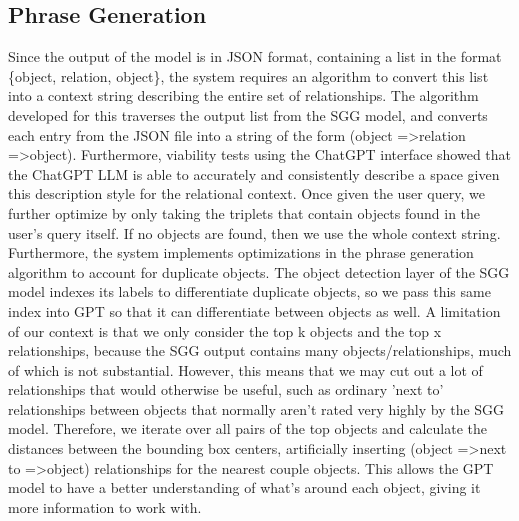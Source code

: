 \documentclass[letterpaper, 10 pt, conference]{ieeeconf}  %
\begin{document}
    
    \subsection*{Phrase Generation}
        Since the output of the model is in JSON format, containing a list in the format \{object, relation, object\}, the system requires an algorithm to convert this list into a context string describing the entire set of relationships. The algorithm developed for this traverses the output list from the SGG model, and converts each entry from the JSON file into a string of the form (object =\textgreater  relation =\textgreater  object). Furthermore, viability tests using the ChatGPT interface showed that the ChatGPT LLM is able to accurately and consistently describe a space given this description style for the relational context. Once given the user query, we further optimize by only taking the triplets that contain objects found in the user's query itself. If no objects are found, then we use the whole context string. Furthermore, the system implements optimizations in the phrase generation algorithm to account for duplicate objects. The object detection layer of the SGG model indexes its labels to differentiate duplicate objects, so we pass this same index into GPT so that it can differentiate between objects as well.
        A limitation of our context is that we only consider the top k objects and the top x relationships, because the SGG output contains many objects/relationships, much of which is not substantial. However, this means that we may cut out a lot of relationships that would otherwise be useful, such as ordinary 'next to' relationships between objects that normally aren't rated very highly by the SGG model. Therefore, we iterate over all pairs of the top objects and calculate the distances between the bounding box centers, artificially inserting (object =\textgreater  next to =\textgreater  object) relationships for the nearest couple objects. This allows the GPT model to have a better understanding of what's around each object, giving it more information to work with.
    
\end{document}
